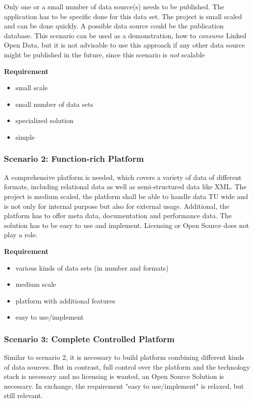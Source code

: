 Only one or a small number of data source(s) needs to be published. The 
application has to be specific done for this data set. The project is small scaled 
and can be done quickly. A possible data source could be the publication database. 
This scenario can be used as a demonstration, how to \emph{consume} Linked Open 
Data, but it is not advisable to use this approach if any other data source might 
be published in the future, since this scenario is \emph{not} scalable

\textbf{Requirement}
\begin{itemize}
\itemsep0pt
\item small scale
\item small number of data sets
\item specialized solution
\item simple
\end{itemize}

\subsubsection{Scenario 2: Function-rich Platform}

A comprehensive platform is needed, which covers a variety of data of different 
formats, including relational data as well as semi-structured data like XML. The 
project is medium scaled, the platform shall be able to handle data TU wide and is 
not only for internal purpose but also for external usage. Additional, the 
platform has to offer meta data, documentation and performance data. The solution 
has to be easy to use and implement. Licensing or Open Source does not play a 
role. 

\textbf{Requirement}
\begin{itemize}
\itemsep0pt
\item various kinds of data sets (in number and formats)
\item medium scale
\item platform with additional features
\item easy to use/implement
\end{itemize}

\subsubsection{Scenario 3: Complete Controlled Platform}

Similar to scenario 2, it is necessary to build platform combining different kinds 
of data sources. But in contrast, full control over the platform and the 
technology stack is necessary and no licensing is wanted, an Open Source Solution 
is necessary. In exchange, the requirement "easy to use/implement" is relaxed, but 
still relevant.

